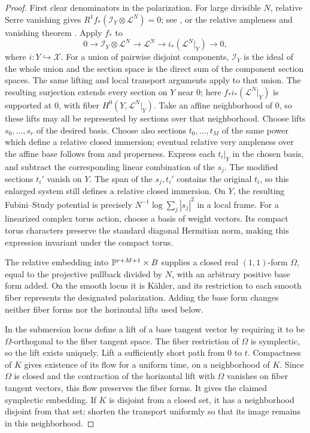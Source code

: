 \begin{proof}
First clear denominators in the polarization. For large divisible
\(N\), relative Serre vanishing gives
\(R^1f_*(\mathcal I_Y\otimes\mathcal L^N)=0\);
see \cite[Tag~02O1]{Stacks}, or the relative ampleness and
vanishing theorem \cite[Theorem~1.7.6]{Lazarsfeld2004}.
Apply \(f_*\) to
\[
 0\longrightarrow\mathcal I_Y\otimes\mathcal L^N
 \longrightarrow\mathcal L^N
 \longrightarrow i_*(\mathcal L^N|_Y)\longrightarrow0,
\]
where \(i:Y\hookrightarrow\mathcal X\).
For a union of pairwise disjoint components, \(\mathcal I_Y\) is the
ideal of the whole union and the section space is the direct sum of the
component section spaces. The same lifting and local transport
arguments apply to that union.
The resulting surjection extends every section on \(Y\) near \(0\);
here \(f_*i_*(\mathcal L^N|_Y)\) is supported at \(0\), with fiber
\(H^0(Y,\mathcal L^N|_Y)\).
Take an affine neighborhood of \(0\), so these lifts may all be
represented by sections over that neighborhood.
Choose lifts \(s_0,\ldots,s_r\) of the desired basis. Choose also
sections \(t_0,\ldots,t_M\) of the same power which define a
relative closed immersion; eventual relative very ampleness over
the affine base follows from \cite[Tag~01VT]{Stacks} and properness.
Express each \(t_i|_Y\) in the chosen
basis, and subtract the corresponding linear combination of the
\(s_j\). The modified sections \(t_i'\) vanish on \(Y\).
The span of the \(s_j,t_i'\) contains the original \(t_i\), so this
enlarged system still defines a relative closed immersion.
On \(Y\), the resulting Fubini--Study potential is precisely
\(N^{-1}\log\sum_j|s_j|^2\) in a local frame.
For a linearized complex torus action, choose a basis of weight vectors.
Its compact torus characters preserve the standard diagonal Hermitian
norm, making this expression invariant under the compact torus.

The relative embedding into \(\mathbb P^{r+M+1}\times B\) supplies a closed
real \((1,1)\)-form \(\Omega\), equal to the projective pullback
divided by \(N\), with an arbitrary positive base form added.
On the smooth locus it is K\"ahler, and its restriction to each
smooth fiber represents the designated polarization.
Adding the base form changes neither fiber forms nor the
horizontal lifts used below.

In the submersion locus define a lift of a base tangent vector by
requiring it to be \(\Omega\)-orthogonal to the fiber tangent space.
The fiber restriction of \(\Omega\) is symplectic, so the lift
exists uniquely. Lift a sufficiently short path from \(0\) to \(t\).
Compactness of \(K\) gives existence of its flow for a uniform
time, on a neighborhood of \(K\). Since \(\Omega\) is closed and
the contraction of the horizontal lift with \(\Omega\) vanishes
on fiber tangent vectors, this flow preserves the fiber forms.
It gives the claimed symplectic embedding. If \(K\) is disjoint
from a closed set, it has a neighborhood disjoint from that set;
shorten the transport uniformly so that its image remains in
this neighborhood.


\end{proof}
